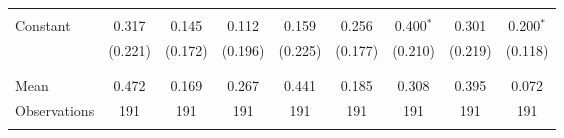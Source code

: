 \begin{tabular}{@{\extracolsep{5pt}}lcccccccc}
  & & & & & & & & \\ 
 Constant & 0.317 & 0.145 & 0.112 & 0.159 & 0.256 & 0.400$^{*}$ & 0.301 & 0.200$^{*}$ \\ 
  & (0.221) & (0.172) & (0.196) & (0.225) & (0.177) & (0.210) & (0.219) & (0.118) \\ 
  & & & & & & & & \\ 
\hline \\[-1.8ex] 
Mean & 0.472 & 0.169 & 0.267 & 0.441 & 0.185 & 0.308 & 0.395 & 0.072 \\ 
Observations & 191 & 191 & 191 & 191 & 191 & 191 & 191 & 191 \\ 
\hline 
\hline \\[-1.8ex] 
\end{tabular} 
